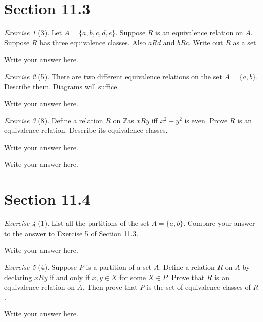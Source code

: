 \documentclass[12pt]{amsart}
\makeatletter
\theoremstyle{remark}
\newtheorem*{exercise}{Exercise}%
\def\ZZ{\ensuremath{\mathbb Z}}
\renewenvironment{proof}[1][\proofname]{\par\doublespacing
  \pushQED{\qed}%
  \normalfont \topsep6\p@\@plus6\p@\relax
  \list{}{%
    \settowidth{\leftmargin}{\itshape\proofname:\hskip\labelsep}%
    \setlength{\labelwidth}{0pt}%
    \setlength{\itemindent}{-\leftmargin}%
  }%
  \item[\hskip\labelsep\itshape#1\@addpunct{:}]\ignorespaces
}{%
  \popQED\endlist\@endpefalse
  \singlespacing
}
\theoremstyle{mycomment}
\makeatother
\begin{document}
\section*{Section 11.3}

\begin{exercise}[3] Let $A=\{a,b,c,d,e\}$. Suppose $R$ is an equivalence relation on $A$. Suppose $R$ has three equivalence classes. Also $aRd$ and $bRc$. Write out $R$ as a set.
\begin{proof}[Solution]
Write your answer here.
\end{proof}
\end{exercise}

\begin{exercise}[5] There are two different equivalence relations on the set $A=\{a,b\}$. Describe them. Diagrams will suffice.
\begin{proof}[Solution]
Write your answer here.
\end{proof}
\end{exercise}

\begin{exercise}[8] Define a relation $R$ on \ZZ as $xRy$ iff $x^{2}+y^{2}$ is even. Prove $R$ is an equivalence relation. Describe its equivalence classes.
\begin{proof}
Write your answer here.
\end{proof}
\begin{proof}[Solution]
Write your answer here.
\end{proof}
\end{exercise}



\section*{Section 11.4}
\begin{exercise}[1] List all the partitions of the set $A=\{a,b\}$. Compare your answer to the answer to Exercise 5 of Section 11.3.
\begin{proof}[Solution]
Write your answer here.
\end{proof}
\end{exercise}

\begin{exercise}[4] Suppose $P$ is a partition of a set $A$. Define a relation $R$ on $A$ by declaring $xRy$ if and only if $x,y\in X$ for some $X\in P$. Prove that $R$ is an equivalence relation on $A$. Then prove that $P$ is the set of equivalence classes of $R$.
\begin{proof}
Write your answer here.
\end{proof}
\end{exercise}
\end{document}
